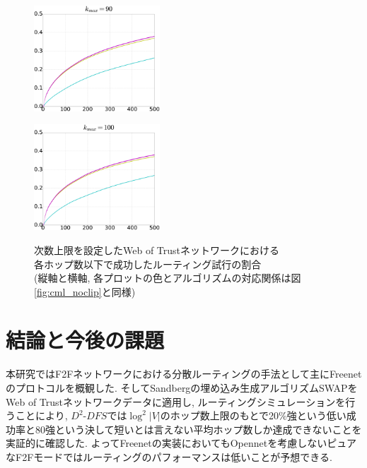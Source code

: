 \documentclass[dvipdfmx]{ampbt}
\begin{document}
\begin{figure}[htbp]
\begin{minipage}{0.33\hsize}
\begin{center}
     \end{center}
     \label{fig:32}
    \end{minipage}\begin{minipage}{0.33\hsize}
     \begin{center}
      \includegraphics[width=47mm]{../fig/cml_90clip.eps}
     \end{center}
     \label{fig:33}
    \end{minipage}
    \begin{center}
     \begin{minipage}{0.33\hsize}
      \centerline{\includegraphics[width=47mm]{../fig/cml_100clip.eps}}
      \label{fig:41}
     \end{minipage}
    \end{center}

    \caption{次数上限を設定したWeb of Trustネットワークにおける \\ 各ホップ数以下で成功したルーティング試行の割合 \\ (縦軸と横軸, 各プロットの色とアルゴリズムの対応関係は図\ref{fig:cml_noclip}と同様) }
    \label{fig:cml_dclip}
   \end{figure}


\section{結論と今後の課題}
本研究ではF2Fネットワークにおける分散ルーティングの手法として主にFreenetのプロトコルを概観した. そしてSandbergの埋め込み生成アルゴリズムSWAPをWeb of Trustネットワークデータに適用し, ルーティングシミュレーションを行うことにより, $D^2$-$DFS$では$\log^2|V|$のホップ数上限のもとで20\%強という低い成功率と80強という決して短いとは言えない平均ホップ数しか達成できないことを実証的に確認した. よってFreenetの実装においてもOpennetを考慮しないピュアなF2Fモードではルーティングのパフォーマンスは低いことが予想できる.
\end{document}
